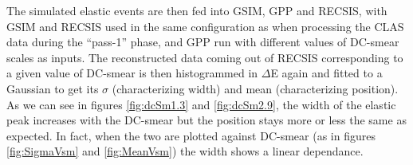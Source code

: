 The simulated elastic events are then fed into GSIM, GPP and RECSIS, with GSIM and RECSIS used in the same configuration as when processing the CLAS data 
during the ``pass-1'' phase, and GPP run with different values of DC-smear scales as inputs. The reconstructed data coming out of RECSIS corresponding to 
a given value of DC-smear is then histogrammed in $\Delta$E again and fitted to a Gaussian to get its $\sigma$ (characterizing width) and mean (characterizing position). As we can see in figures \ref{fig:dcSm1.3} and \ref{fig:dcSm2.9}, %
the width of the elastic peak increases with the DC-smear but the position stays more or less the same as expected. In fact, when the two are plotted 
against DC-smear (as in figures \ref{fig:SigmaVsm} and \ref{fig:MeanVsm}) %
the width shows a linear dependance.






